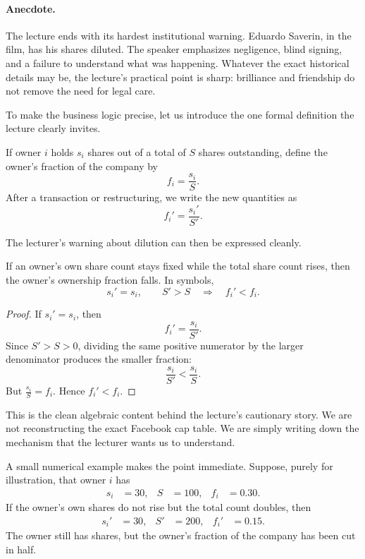 \paragraph{Anecdote.}
The lecture ends with its hardest institutional warning. Eduardo Saverin, in the film, has his shares diluted. The speaker emphasizes negligence, blind signing, and a failure to understand what was happening. Whatever the exact historical details may be, the lecture's practical point is sharp: brilliance and friendship do not remove the need for legal care.

To make the business logic precise, let us introduce the one formal definition the lecture clearly invites.

\begin{definition}
If owner \(i\) holds \(s_i\) shares out of a total of \(S\) shares outstanding, define the owner's fraction of the company by
\begin{equation}
f_i = \frac{s_i}{S}.
\end{equation}
After a transaction or restructuring, we write the new quantities as
\begin{equation}
f_i' = \frac{s_i'}{S'}.
\end{equation}
\end{definition}

The lecturer's warning about dilution can then be expressed cleanly.

\begin{proposition}
If an owner's own share count stays fixed while the total share count rises, then the owner's ownership fraction falls. In symbols,
\begin{equation}
s_i' = s_i,
\qquad
S' > S
\quad \Longrightarrow \quad
f_i' < f_i.
\end{equation}
\end{proposition}

\begin{proof}
If \(s_i' = s_i\), then
\[
f_i' = \frac{s_i}{S'}.
\]
Since \(S' > S > 0\), dividing the same positive numerator by the larger denominator produces the smaller fraction:
\[
\frac{s_i}{S'} < \frac{s_i}{S}.
\]
But \(\frac{s_i}{S} = f_i\). Hence \(f_i' < f_i\).
\end{proof}

This is the clean algebraic content behind the lecture's cautionary story. We are not reconstructing the exact Facebook cap table. We are simply writing down the mechanism that the lecturer wants us to understand.

A small numerical example makes the point immediate. Suppose, purely for illustration, that owner \(i\) has
\begin{align}
s_i &= 30,
&
S &= 100,
&
f_i &= 0.30.
\end{align}
If the owner's own shares do not rise but the total count doubles, then
\begin{align}
s_i' &= 30,
&
S' &= 200,
&
f_i' &= 0.15.
\end{align}
The owner still has shares, but the owner's fraction of the company has been cut in half.

